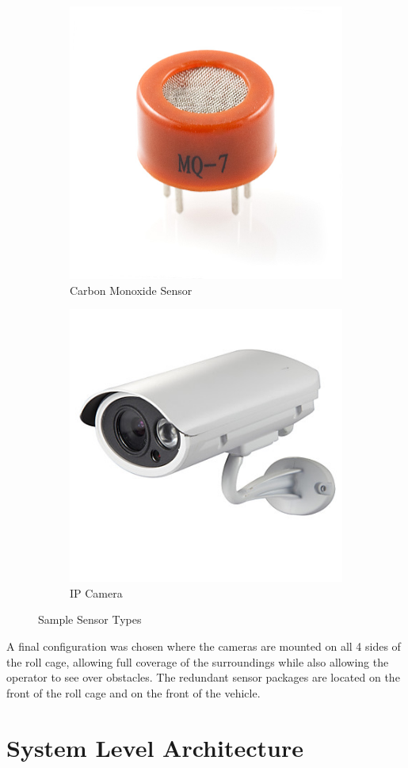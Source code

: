 \begin{figure}[H]
\centering
\begin{subfigure}{.5\textwidth}
  \centering
  \includegraphics[height=.5\linewidth]{cosensor}
  \caption{Carbon Monoxide Sensor}
  \label{fig:sub1}
\end{subfigure}%
\begin{subfigure}{.5\textwidth}
  \centering
  \includegraphics[height=.5\linewidth]{camera}
  \caption{IP Camera}
  \label{fig:sub2}
\end{subfigure}
\caption{Sample Sensor Types}
\label{fig:sensortest}
\end{figure}

A final configuration was chosen where the cameras are mounted on all 4 sides of the roll cage, allowing full coverage of the surroundings while also allowing the operator to see over obstacles. The redundant sensor packages are  located on the front of the roll cage and on the front of the vehicle. 

 
%
\section{System Level Architecture}

